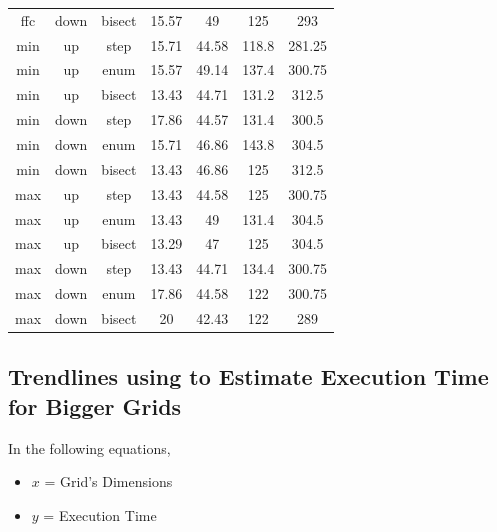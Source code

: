 \documentclass[runningheads]{llncs}
\begin{document}
\begin{table} [h]
\begin{tabularx}{\textwidth}{|C|C|C|C|C|C|C|}
        ffc      & down & bisect & 15.57 & 49    & 125    & 293    \\
        min      & up   & step   & 15.71 & 44.58 & 118.8  & 281.25 \\
        min      & up   & enum   & 15.57 & 49.14 & 137.4  & 300.75 \\
        min      & up   & bisect & 13.43 & 44.71 & 131.2  & 312.5  \\
        min      & down & step   & 17.86 & 44.57 & 131.4  & 300.5  \\
        min      & down & enum   & 15.71 & 46.86 & 143.8  & 304.5  \\
        min      & down & bisect & 13.43 & 46.86 & 125    & 312.5  \\
        max      & up   & step   & 13.43 & 44.58 & 125    & 300.75 \\
        max      & up   & enum   & 13.43 & 49    & 131.4  & 304.5  \\
        max      & up   & bisect & 13.29 & 47    & 125    & 304.5  \\
        max      & down & step   & 13.43 & 44.71 & 134.4  & 300.75 \\
        max      & down & enum   & 17.86 & 44.58 & 122    & 300.75 \\
        max      & down & bisect & 20    & 42.43 & 122    & 289    \\
        \hline
    \end{tabularx}
\end{table}

\newpage
\subsection{Trendlines using to Estimate Execution Time for Bigger Grids} \label{trendlines}
In the following equations,
\begin{itemize}
    \item \(x\) = Grid's Dimensions
    \item \(y\) = Execution Time
\end{itemize}
\end{document}
